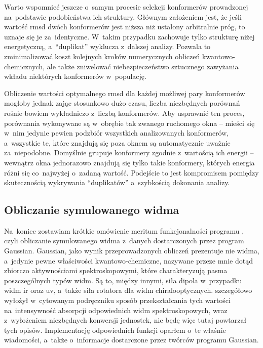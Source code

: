 Warto wspomnieć jeszcze o~samym procesie selekcji konformerów prowadzonej na~podstawie
  podobieństwa ich struktury.
Głównym założeniem jest, że jeśli wartość \gls{rmsd} dwóch konformerów jest niższa niż
  ustalony arbitralnie próg, to uznaje się je za~identyczne.
W~takim przypadku \tesliper{} zachowuje tylko strukturę niżej energetyczną, a~\enquote{duplikat}
  wyklucza z~dalszej analizy.
Pozwala to zminimalizować koszt kolejnych kroków numerycznych obliczeń kwantowo-chemicznych,
  ale także zniwelować niebezpieczeństwo sztucznego zawyżania
  wkładu niektórych konformerów w~populację.

Obliczenie wartości optymalnego \gls{rmsd} dla każdej możliwej pary konformerów mogłoby
  jednak zając stosunkowo dużo czasu, liczba niezbędnych porównań rośnie bowiem
  wykładniczo z~liczbą konformerów.
Aby usprawnić ten proces, porównania wykonywane są w~obrębie tak zwanego ruchomego okna \---
  mieści się w~nim jedynie pewien podzbiór wszystkich analizowanych konformerów,
  a~wszystkie te, które znajdują się poza oknem są automatycznie uważnie za~niepodobne.
Domyślnie \tesliper{} grupuje konformery zgodnie z~wartością ich energii \--- wewnątrz
  okna jednorazowo znajdują się tylko takie konformery, których energia różni się
  co~najwyżej o~zadaną wartość.
Podejście to jest kompromisem pomiędzy skutecznością wykrywania \enquote{duplikatów}
  a~szybkością dokonania analizy.

\subsection{Obliczanie symulowanego widma}\label{implementation:spectra}
Na~koniec zostawiam krótkie omówienie meritum funkcjonalności programu \tesliper{},
  czyli obliczanie symulowanego widma z~danych dostarczonych przez program Gaussian.
Gaussian, jako wynik przeprowadzonych obliczeń prezentuje nie widma, a~jedynie pewne właściwości
  kwantowo-chemiczne, nazywane przeze mnie dotąd zbiorczo aktywnościami spektroskopowymi,
  które charakteryzują pasma poszczególnych typów widm.
Są to, między innymi, siła dipola w~przypadku widm \gls{ir} oraz \gls{uv}, a~także siła
  rotatora dla widm chiralooptycznych.
\citeauthor{polavarapu17} szczegółowo wyłożył w~cytowanym podręczniku
  sposób przekształcania tych wartości na~intensywność absorpcji odpowiednich widm
  spektroskopowych, wraz z~wyłożeniem niezbędnych konwersji jednostek, nie będę więc tutaj
  powtarzał tych opisów.
Implementację odpowiednich funkcji oparłem o~te właśnie wiadomości, a~także o~informacje
  dostarczone przez twórców programu Gaussian.

